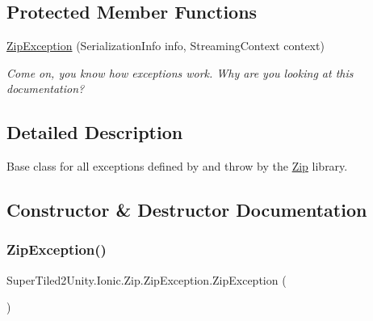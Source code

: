 \subsection*{Protected Member Functions}
\begin{DoxyCompactItemize}
\item 
\mbox{\hyperlink{class_super_tiled2_unity_1_1_ionic_1_1_zip_1_1_zip_exception_af19312b03a624c314e71dd8fc8dd7982}{Zip\+Exception}} (Serialization\+Info info, Streaming\+Context context)
\begin{DoxyCompactList}\small\item\em Come on, you know how exceptions work. Why are you looking at this documentation? \end{DoxyCompactList}\end{DoxyCompactItemize}


\subsection{Detailed Description}
Base class for all exceptions defined by and throw by the \mbox{\hyperlink{namespace_super_tiled2_unity_1_1_ionic_1_1_zip}{Zip}} library. 



\subsection{Constructor \& Destructor Documentation}
\mbox{\label{class_super_tiled2_unity_1_1_ionic_1_1_zip_1_1_zip_exception_a0fcf97ad85d524e883636821dcb542e3}} 
\subsubsection{\texorpdfstring{Zip\+Exception()}{ZipException()}\hspace{0.1cm}{\footnotesize\ttfamily [1/4]}}
{\footnotesize\ttfamily Super\+Tiled2\+Unity.\+Ionic.\+Zip.\+Zip\+Exception.\+Zip\+Exception (\begin{DoxyParamCaption}{ }\end{DoxyParamCaption})}



